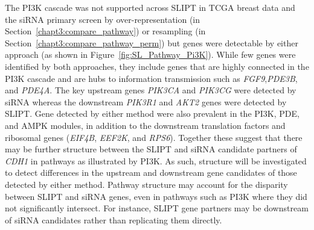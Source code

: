 \begin{figure*}[!tb]
  \begin{center}
   }
   \end{center}
   \caption[synthetic lethality in the PI3K cascade]{\small \textbf{synthetic lethality in the PI3K cascade.} The Reactome PI3K Cascade pathway with \gls{synthetic lethal} candidates coloured as shown in the legend.
}
\label{fig:SL_Pathway_Pi3K}
\end{figure*}

The \gls{PI3K} cascade was not supported across \gls{SLIPT} in \gls{TCGA} breast  data and the \gls{siRNA} primary screen by over-representation (in Section~\ref{chapt3:compare_pathway}) or resampling (in Section~\ref{chapt3:compare_pathway_perm}) but genes were detectable by either approach (as shown in Figure~\ref{fig:SL_Pathway_Pi3K}).  While few genes were identified by both approaches, they include genes that are highly connected in the PI3K cascade and are hubs to information transmission such as \textit{FGF9},\textit{PDE3B}, and \textit{PDE4A}. The key upstream genes \textit{PIK3CA} and \textit{PIK3CG} were detected by \gls{siRNA} whereas the downstream \textit{PIK3R1} and \textit{AKT2} genes were detected by \gls{SLIPT}. Gene detected by either method were also prevalent in the \gls{PI3K}, \gls{PDE}, and \gls{AMPK} modules, in addition to the downstream translation factors and ribosomal genes (\textit{EIF4B}, \textit{EEF2K}, and \textit{RPS6}). Together these suggest that there may be further structure between the \gls{SLIPT} and \gls{siRNA} candidate partners of \textit{CDH1} in pathways as illustrated by \gls{PI3K}. As such,  structure will be investigated to detect differences in the upstream and downstream gene candidates of those detected by either method. Pathway structure may account for the disparity between \gls{SLIPT} and \gls{siRNA} genes, even in pathways such as PI3K where they did not significantly intersect. For instance, \gls{SLIPT} gene partners may be downstream of \gls{siRNA} candidates rather than replicating them directly.

